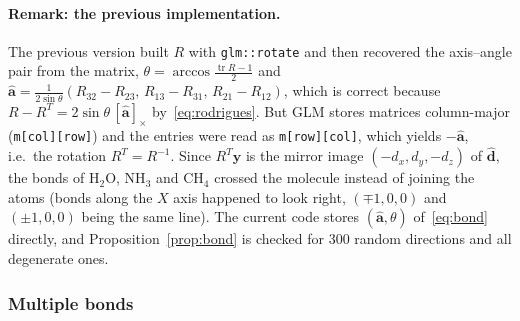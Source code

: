 \documentclass[a4paper, 11pt]{article}
\newcommand{\code}[1]{\texttt{#1}}
\begin{document}
\paragraph{Remark: the previous implementation.} The previous version built $R$ with \code{glm::rotate} and then recovered the axis--angle pair from
the matrix, $\theta=\arccos\frac{\operatorname{tr}R-1}{2}$ and $\hat{\mathbf a}=\frac{1}{2\sin\theta}(R_{32}-R_{23},\,R_{13}-R_{31},\,R_{21}-R_{12})$,
which is correct because $R-R^{T}=2\sin\theta\,[\hat{\mathbf a}]_\times$ by~\eqref{eq:rodrigues}. But GLM stores matrices column-major
(\code{m[col][row]}) and the entries were read as \code{m[row][col]}, which yields $-\hat{\mathbf a}$, i.e.\ the rotation $R^{T}=R^{-1}$. Since
$R^{T}\hat{\mathbf y}$ is the mirror image $(-d_x,d_y,-d_z)$ of $\hat{\mathbf d}$, the bonds of H$_2$O, NH$_3$ and CH$_4$ crossed the molecule instead
of joining the atoms (bonds along the $X$ axis happened to look right, $(\mp1,0,0)$ and $(\pm1,0,0)$ being the same line). The current code stores
$(\hat{\mathbf a},\theta)$ of~\eqref{eq:bond} directly, and Proposition~\ref{prop:bond} is checked for 300 random directions and all degenerate ones.

\subsubsection{Multiple bonds}
\end{document}

